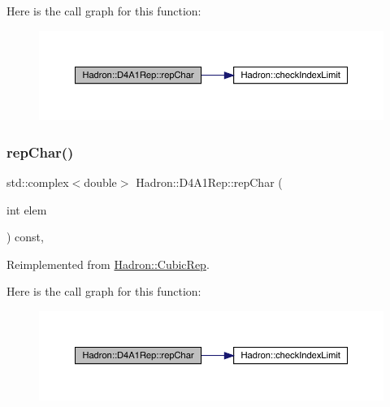 Here is the call graph for this function\+:
\nopagebreak
\begin{figure}[H]
\begin{center}
\leavevmode
\includegraphics[width=350pt]{d8/d02/structHadron_1_1D4A1Rep_a45938f0cd557c639eedba39b63fabe29_cgraph}
\end{center}
\end{figure}
\mbox{\label{structHadron_1_1D4A1Rep_a45938f0cd557c639eedba39b63fabe29}} 
\subsubsection{\texorpdfstring{repChar()}{repChar()}\hspace{0.1cm}{\footnotesize\ttfamily [2/2]}}
{\footnotesize\ttfamily std\+::complex$<$double$>$ Hadron\+::\+D4\+A1\+Rep\+::rep\+Char (\begin{DoxyParamCaption}\item[{int}]{elem }\end{DoxyParamCaption}) const\hspace{0.3cm}{\ttfamily [inline]}, {\ttfamily [virtual]}}



Reimplemented from \mbox{\hyperlink{structHadron_1_1CubicRep_af45227106e8e715e84b0af69cd3b36f8}{Hadron\+::\+Cubic\+Rep}}.

Here is the call graph for this function\+:
\nopagebreak
\begin{figure}[H]
\begin{center}
\leavevmode
\includegraphics[width=350pt]{d8/d02/structHadron_1_1D4A1Rep_a45938f0cd557c639eedba39b63fabe29_cgraph}
\end{center}
\end{figure}
\mbox{\label{structHadron_1_1D4A1Rep_a4dca745781630db08cee88f37cae21b6}} 
